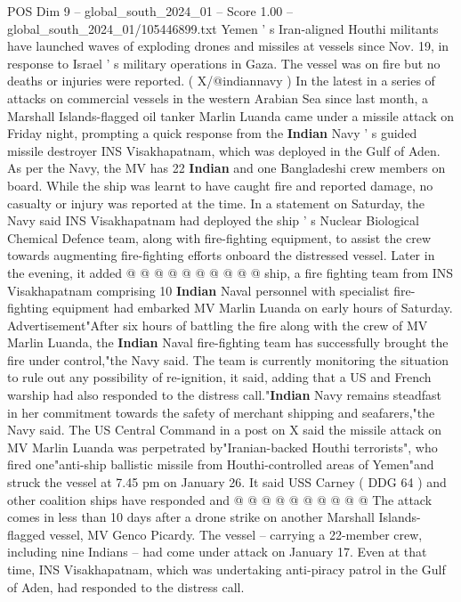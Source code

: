\begin{textsample}{POS Dim 9 – global\_south\_2024\_01 – Score 1.00 – global\_south\_2024\_01/105446899.txt}  \label{ex:f9_pos_022}
Yemen ' s Iran-aligned Houthi militants have launched waves of exploding drones and missiles at vessels since Nov. 19, in response to Israel ' s military operations in Gaza.
The vessel was on fire but no deaths or injuries were reported. ( X/@indiannavy ) In the latest in a series of attacks on commercial vessels in the western Arabian Sea since last month, a Marshall Islands-flagged oil tanker Marlin Luanda came under a missile attack on Friday night, prompting a quick response from the \textbf{Indian} Navy ' s guided missile destroyer INS Visakhapatnam, which was deployed in the Gulf of Aden.
As per the Navy, the MV has 22 \textbf{Indian} and one Bangladeshi crew members on board.
While the ship was learnt to have caught fire and reported damage, no casualty or injury was reported at the time.
In a statement on Saturday, the Navy said INS Visakhapatnam had deployed the ship ' s Nuclear Biological Chemical Defence team, along with fire-fighting equipment, to assist the crew towards augmenting fire-fighting efforts onboard the distressed vessel.
Later in the evening, it added @ @ @ @ @ @ @ @ @ @ ship, a fire fighting team from INS Visakhapatnam comprising 10 \textbf{Indian} Naval personnel with specialist fire-fighting equipment had embarked MV Marlin Luanda on early hours of Saturday.
Advertisement"After six hours of battling the fire along with the crew of MV Marlin Luanda, the \textbf{Indian} Naval fire-fighting team has successfully brought the fire under control,"the Navy said.
The team is currently monitoring the situation to rule out any possibility of re-ignition, it said, adding that a US and French warship had also responded to the distress call."\textbf{Indian} Navy remains steadfast in her commitment towards the safety of merchant shipping and seafarers,"the Navy said.
The US Central Command in a post on X said the missile attack on MV Marlin Luanda was perpetrated by"Iranian-backed Houthi terrorists", who fired one"anti-ship ballistic missile from Houthi-controlled areas of Yemen"and struck the vessel at 7.45 pm on January 26.
It said USS Carney ( DDG 64 ) and other coalition ships have responded and @ @ @ @ @ @ @ @ @ @ The attack comes in less than 10 days after a drone strike on another Marshall Islands-flagged vessel, MV Genco Picardy.
The vessel -- carrying a 22-member crew, including nine Indians -- had come under attack on January 17.
Even at that time, INS Visakhapatnam, which was undertaking anti-piracy patrol in the Gulf of Aden, had responded to the distress call.

\end{textsample}
